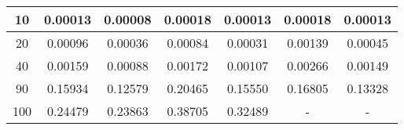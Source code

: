 \begin{table}[!h]
\begin{tabular}{|c|cc|cc|cc|}
10                                                                   & \multicolumn{1}{c|}{0.00013}                       & 0.00008                      & \multicolumn{1}{c|}{0.00018}                     & 0.00013                     & \multicolumn{1}{c|}{0.00018}                   & 0.00013                  \\ \hline
20                                                                   & \multicolumn{1}{c|}{0.00096}                       & 0.00036                      & \multicolumn{1}{c|}{0.00084}                     & 0.00031                     & \multicolumn{1}{c|}{0.00139}                   & 0.00045                  \\ \hline
40                                                                   & \multicolumn{1}{c|}{0.00159}                       & 0.00088                      & \multicolumn{1}{c|}{0.00172}                     & 0.00107                     & \multicolumn{1}{c|}{0.00266}                   & 0.00149                  \\ \hline
90                                                                   & \multicolumn{1}{c|}{0.15934}                       & 0.12579                      & \multicolumn{1}{c|}{0.20465}                     & 0.15550                     & \multicolumn{1}{c|}{0.16805}                   & 0.13328                  \\ \hline
100                                                                  & \multicolumn{1}{c|}{0.24479}                       & 0.23863                      & \multicolumn{1}{c|}{0.38705}                     & 0.32489                     & \multicolumn{1}{c|}{-}                         & -                        \\ \hline
\end{tabular}
\end{table}








    



